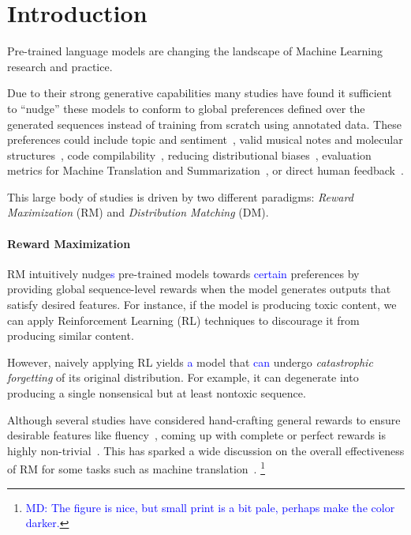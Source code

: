 \section{Introduction}

Pre-trained language models \citep{devlin-etal-2019-bert,radford2019language} are changing the landscape of Machine Learning research and practice. 

Due to their strong generative capabilities many studies have found it sufficient to ``nudge'' these models to conform to global preferences defined over the generated sequences instead of training from scratch using annotated data. These preferences could include topic and sentiment~\citep{plug_and_play_20}, valid musical notes and molecular structures~\citep{KL_Jaques17}, code compilability~\citep{korbak2021code}, reducing distributional biases~\citep{khalifa_2021, ethical_lm_deepmind}, evaluation metrics for Machine Translation and Summarization~\citep{seq_lvl_train_RanzatoCAZ15,bahdanau_actor-critic_2016}, or direct human feedback~\citep{Ziegler19,ziegler_summarize2021}.

This large body of studies is driven by two different paradigms: \emph{Reward Maximization} (RM) and \emph{Distribution Matching} (DM).

\paragraph{Reward Maximization} RM intuitively nudge\textcolor{blue}{s} pre-trained models towards \textcolor{blue}{certain} preferences by providing global sequence-level rewards when the model generates outputs that satisfy desired features. For instance, if the model is producing toxic content, we can apply Reinforcement Learning (RL) techniques to discourage it from producing similar content. 

However, naively applying RL yields \textcolor{blue}{a} model that \textcolor{blue}{can} undergo \emph{catastrophic forgetting} of its original distribution. For example, it can degenerate into producing a single nonsensical but at least nontoxic sequence. 

Although several studies have considered hand-crafting general rewards to ensure desirable features like fluency~\citep{LiuLSNCP16,RL_TambwekarDMMHR19}, coming up with complete or perfect rewards is highly non-trivial~\citep{Wu_googleMT16,VedantamZP15}. This has sparked a wide discussion on the overall effectiveness of RM for some tasks such as machine translation~\citep{Choshen20WeaknessRL,KiegelandK21}.
{\color{blue}\footnote{\textcolor{blue}{MD: The figure is nice, but small print is a bit pale, perhaps make the color darker.}}}

